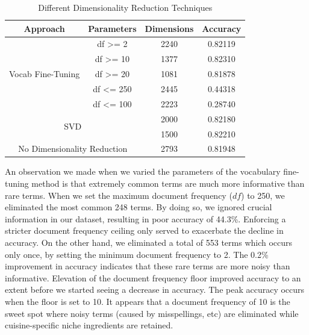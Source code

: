 \documentclass{article}
\begin{document}
\begin{table}[h]
\centering
\begin{tabular}{|c|c|c|c|}
\hline
\textbf{Approach}                  & \textbf{Parameters}   & \textbf{Dimensions} & \textbf{Accuracy} \\ \hline
\multirow{5}{*}{Vocab Fine-Tuning} & df \textgreater{}= 2  & 2240       & 0.82119  \\ \cline{2-4} 
                                   & df \textgreater{}= 10 & 1377       & 0.82310  \\ \cline{2-4} 
                                   & df \textgreater{}= 20 & 1081       & 0.81878  \\ \cline{2-4} 
                                   & df \textless{}= 250   & 2445       & 0.44318  \\ \cline{2-4} 
                                   & df \textless{}= 100   & 2223       & 0.28740  \\ \hline
\multicolumn{2}{|c|}{\multirow{2}{*}{SVD}}                 & 2000       & 0.82180 \\ \cline{3-4} 
\multicolumn{2}{|c|}{}                                     & 1500       & 0.82210  \\ \hline
\multicolumn{2}{|c|}{No Dimensionality Reduction}          & 2793       & 0.81948  \\ \hline
\end{tabular}
\caption{Different Dimensionality Reduction Techniques}
\label{dimredu}
\end{table}

An observation we made when we varied the parameters of the vocabulary fine-tuning method is that extremely common terms are much more informative than rare terms. When we set the maximum document frequency ($df$) to 250, we eliminated the most common 248 terms. By doing so, we ignored crucial information in our dataset, resulting in poor accuracy of 44.3\%. Enforcing a stricter document frequency ceiling only served to exacerbate the decline in accuracy. On the other hand, we eliminated a total of 553 terms which occurs only once, by setting the minimum document frequency to 2. The 0.2\% improvement in accuracy indicates that these rare terms are more noisy than informative. Elevation of the document frequency floor improved accuracy to an extent before we started seeing a decrease in accuracy. The peak accuracy occurs when the floor is set to 10. It appears that a document frequency of 10 is the sweet spot where noisy terms (caused by misspellings, etc) are eliminated while cuisine-specific niche ingredients are retained.
\end{document}
